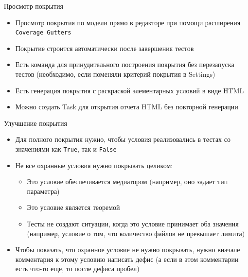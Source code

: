 \documentclass[hyperref={unicode=true}]{beamer}
\begin{document}
    \begin{frame}{Просмотр покрытия}
    \begin{itemize}
    \item Просмотр покрытия по модели прямо в редакторе
          при помощи расширения \texttt{Coverage Gutters}
    \item Покрытие строится автоматически после завершения тестов
    \item Есть команда для принудительного построения покрытия без перезапуска тестов
          (необходимо, если поменяли критерий покрытия в Settings)
    \item Есть генерация покрытия с раскраской элементарных условий в виде HTML
    \item Можно создать Task для открытия отчета HTML без повторной генерации
    \end{itemize}
    \end{frame}

    \begin{frame}{Улучшение покрытия}
    \begin{itemize}
    \item Для полного покрытия нужно, чтобы условия реализовались
          в тестах со значениями как \texttt{True}, так и \texttt{False}
    \item Не все охранные условия нужно покрывать целиком:
            \begin{itemize}
            \item Это условие обеспечивается медиатором (например, оно задает тип параметра)
            \item Это условие является теоремой
            \item Тесты не создают ситуации, когда это условие
                  принимает оба значения (например, условие о том,
                  что количество файлов не превышает лимита)
            \end{itemize}
    \item Чтобы показать, что охранное условие не нужно покрывать, нужно
          вначале комментария к этому условию написать дефис (а если в этом
          комментарии есть что-то еще, то после дефиса пробел)
    \end{itemize}
    \end{frame}
\end{document}
